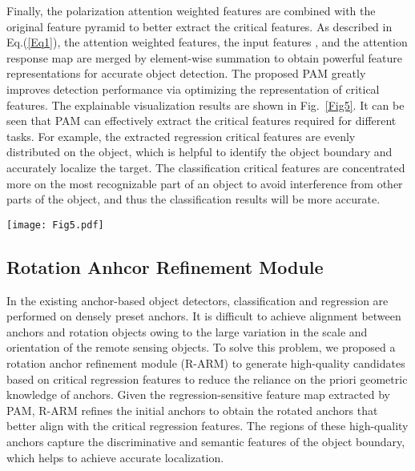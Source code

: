 \documentclass[journal]{IEEEtran}
\begin{document}
Finally, the polarization attention weighted features are combined with the original feature pyramid to better extract the critical features. As described in Eq.(\ref{Eq1}), the attention weighted features,  the input features , and the attention response map  are merged by element-wise summation to obtain powerful feature representations for accurate object detection. The proposed PAM greatly improves detection performance via optimizing the representation of critical features. The explainable visualization results are shown in Fig.~\ref{Fig5}. It can be seen that PAM can effectively extract the critical features required for different tasks. For example, the extracted regression critical features are evenly distributed on the object, which is helpful to identify the object boundary and accurately localize the target. The classification critical features are concentrated more on the most recognizable part of an object to avoid interference from other parts of the object, and thus the classification results will be more accurate.



\begin{figure*}[t]
	\centering
	\texttt{[image: Fig5.pdf]} 
	\caption{Illustration of function of the proposed modules in the detection pipeline. The yellow area represents the center of the high-quality anchors}
	\label{Fig5}
\end{figure*}


\subsection{Rotation Anhcor Refinement Module}
In the existing anchor-based object detectors, classification and regression are performed on densely preset anchors. It is difficult to achieve alignment between anchors and rotation objects owing to the large variation in the scale and orientation of the remote sensing objects. To solve this problem, we proposed a rotation anchor refinement module (R-ARM) to generate high-quality candidates based on critical regression features to reduce the reliance on the priori geometric knowledge of anchors. Given the regression-sensitive feature map extracted by PAM, R-ARM refines the initial anchors to obtain the rotated anchors that better align with the critical regression features. The regions of these high-quality anchors capture the discriminative and semantic features of the object boundary, which helps to achieve accurate localization.
\end{document}
